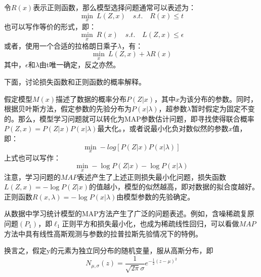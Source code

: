 令$ R(x) $表示正则函数，那么模型选择问题通常可以表述为：
\begin{equation}\label{key}
\min_{x}\:  L(Z,x)\quad s.t.\quad R(x)\leq t
\end{equation}
也可以写作等价的形式，即：
\begin{equation}\label{key}
\min_{x}\: R(x) \quad  s.t.\quad L(Z,x)\leq \epsilon
\end{equation}
或者，使用一个合适的拉格朗日乘子$\lambda $，有：
\begin{equation}\label{key}
\min_{x}\:  L(Z,x)+\lambda R(x)
\end{equation}
其中，$ \epsilon $和$ \lambda $由t唯一确定，反之亦然。

{\heiti 下面，讨论损失函数和正则函数的概率解释。}

假定模型$ M(x) $描述了数据的概率分布$ P(Z|x) $，其中$ x $为该分布的参数。同时，根据贝叶斯方法，假定参数的先验分布为$ P(x|\lambda) $，超参数$ \lambda $暂时假定为固定不变的。那么，模型学习问题就可以转化为MAP参数估计问题，即寻找使得联合概率$ P(Z,x)=P(Z|x)P(x|\lambda) $最大化。，或者说最小化负对数似然的参数$ x $值，即：
\begin{equation}\label{key}
\min_{x} -log\left [P(Z|x)P(x|\lambda)\right ]
\end{equation}
上式也可以写作：
\begin{equation}\label{key}
\min_{x} -\log P(Z|x) - \log P(x|\lambda)
\end{equation}
注意，学习问题的$ MAP $表述产生了上述正则损失最小化问题，损失函数$ L(Z,x)=-\log P(Z|x) $的值越小，模型的似然越高，即对数据的拟合度越好。正则函数$ R(x,\lambda)=-\log P(x|\lambda) $由模型参数的先验确定。



从数据中学习统计模型的MAP方法产生了广泛的问题表述。例如，含噪稀疏复原问题$ (P_1) $，即$ \ell_1$正则平方和损失最小化，也成为稀疏线性回归，可以看做$ MAP $方法中具有线性高斯观测与参数的拉普拉斯先验情况下的特例。

换言之，假定y的元素为独立同分布的随机变量，服从高斯分布，即
\begin{equation}\label{key}
N_{\mu,\sigma}(z)=\dfrac{1}{\sqrt{2\pi }\sigma}e^{-\frac{1}{2}(z-\mu)^2}
\end{equation}



























